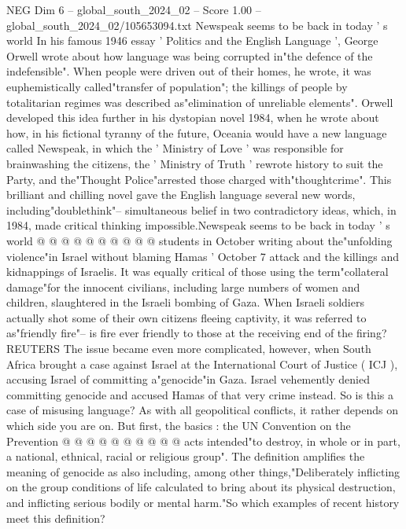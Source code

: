 \begin{textsample}{NEG Dim 6 – global\_south\_2024\_02 – Score 1.00 – global\_south\_2024\_02/105653094.txt}  \label{ex:f6_neg_275}
Newspeak seems to be back in today ' s world In his famous 1946 essay ' Politics and the English Language ', George Orwell wrote about how language was being corrupted in"the defence of the indefensible".
When people were driven out of their homes, he wrote, it was euphemistically called"transfer of population"; the killings of people by totalitarian regimes was described as"elimination of unreliable elements".
Orwell developed this idea further in his dystopian novel 1984, when he wrote about how, in his fictional tyranny of the future, Oceania would have a new language called Newspeak, in which the ' Ministry of Love ' was responsible for brainwashing the citizens, the ' Ministry of Truth ' rewrote history to suit the Party, and the"Thought Police"arrested those charged with"thoughtcrime".
This brilliant and chilling novel gave the English language several new words, including"doublethink"-- simultaneous belief in two contradictory ideas, which, in 1984, made critical thinking impossible.Newspeak seems to be back in today ' s world @ @ @ @ @ @ @ @ @ @ students in October writing about the"unfolding violence"in Israel without blaming Hamas ' October 7 attack and the killings and kidnappings of Israelis.
It was equally critical of those using the term"collateral damage"for the innocent civilians, including large numbers of women and children, slaughtered in the Israeli bombing of Gaza.
When Israeli soldiers actually shot some of their own citizens fleeing captivity, it was referred to as"friendly fire"-- is fire ever friendly to those at the receiving end of the firing?
REUTERS The issue became even more complicated, however, when South Africa brought a case against Israel at the International Court of Justice ( ICJ ), accusing Israel of committing a"genocide"in Gaza.
Israel vehemently denied committing genocide and accused Hamas of that very crime instead.
So is this a case of misusing language?
As with all geopolitical conflicts, it rather depends on which side you are on.
But first, the basics : the UN Convention on the Prevention @ @ @ @ @ @ @ @ @ @ acts intended"to destroy, in whole or in part, a national, ethnical, racial or religious group".
The definition amplifies the meaning of genocide as also including, among other things,"Deliberately inflicting on the group conditions of life calculated to bring about its physical destruction, and inflicting serious bodily or mental harm."So which examples of recent history meet this definition?

\end{textsample}
